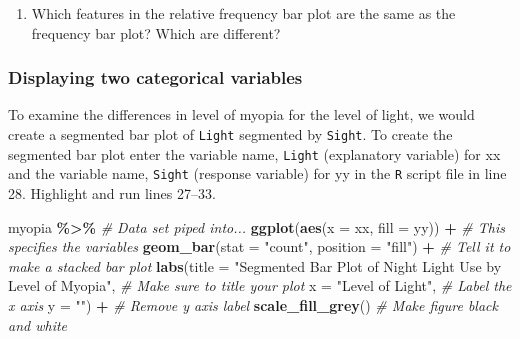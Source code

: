 \documentclass[
]{report}
\newenvironment{Shaded}{\begin{snugshade}}{\end{snugshade}}
\newcommand{\CommentTok}[1]{\textcolor[rgb]{0.56,0.35,0.01}{\textit{#1}}}
\newcommand{\DataTypeTok}[1]{\textcolor[rgb]{0.13,0.29,0.53}{#1}}
\newcommand{\KeywordTok}[1]{\textcolor[rgb]{0.13,0.29,0.53}{\textbf{#1}}}
\newcommand{\NormalTok}[1]{#1}
\newcommand{\OperatorTok}[1]{\textcolor[rgb]{0.81,0.36,0.00}{\textbf{#1}}}
\newcommand{\StringTok}[1]{\textcolor[rgb]{0.31,0.60,0.02}{#1}}
\providecommand{\tightlist}{%
  \setlength{\itemsep}{0pt}\setlength{\parskip}{0pt}}
\begin{document}
\begin{enumerate}
\def\labelenumi{\arabic{enumi}.}
\setcounter{enumi}{3}
\tightlist
\item
  Which features in the relative frequency bar plot are the same as the frequency bar plot? Which are different?
\end{enumerate}

\vspace{1in}

\newpage

\hypertarget{displaying-two-categorical-variables}{%
\subsubsection*{Displaying two categorical variables}\label{displaying-two-categorical-variables}}

To examine the differences in level of myopia for the level of light, we would create a segmented bar plot of \texttt{Light} segmented by \texttt{Sight}. To create the segmented bar plot enter the variable name, \texttt{Light} (explanatory variable) for xx and the variable name, \texttt{Sight} (response variable) for yy in the \texttt{R} script file in line 28. Highlight and run lines 27--33.

\begin{Shaded}
\begin{Highlighting}[]
\NormalTok{myopia }\OperatorTok{\%\textgreater{}\%}\StringTok{ }\CommentTok{\# Data set piped into...}
\KeywordTok{ggplot}\NormalTok{(}\KeywordTok{aes}\NormalTok{(}\DataTypeTok{x =}\NormalTok{ xx, }\DataTypeTok{fill =}\NormalTok{ yy)) }\OperatorTok{+}\StringTok{   }\CommentTok{\# This specifies the variables}
\StringTok{  }\KeywordTok{geom\_bar}\NormalTok{(}\DataTypeTok{stat =} \StringTok{"count"}\NormalTok{, }\DataTypeTok{position =} \StringTok{"fill"}\NormalTok{) }\OperatorTok{+}\StringTok{  }\CommentTok{\# Tell it to make a stacked bar plot}
\StringTok{  }\KeywordTok{labs}\NormalTok{(}\DataTypeTok{title =} \StringTok{"Segmented Bar Plot of Night Light Use by Level of Myopia"}\NormalTok{,  }
       \CommentTok{\# Make sure to title your plot }
       \DataTypeTok{x =} \StringTok{"Level of Light"}\NormalTok{,   }\CommentTok{\# Label the x axis}
       \DataTypeTok{y =} \StringTok{""}\NormalTok{) }\OperatorTok{+}\StringTok{  }\CommentTok{\# Remove y axis label}
\StringTok{    }\KeywordTok{scale\_fill\_grey}\NormalTok{()  }\CommentTok{\# Make figure black and white}
\end{Highlighting}
\end{Shaded}
\end{document}
